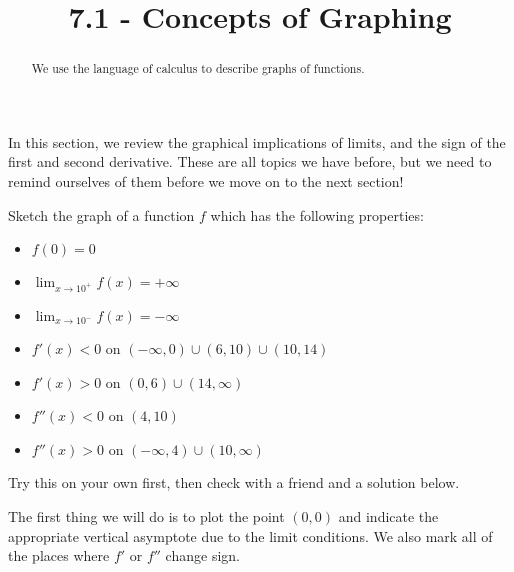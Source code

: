 \documentclass{ximera}
\title{7.1 - Concepts of Graphing}
\begin{document}
\begin{abstract}
  We use the language of calculus to describe graphs of functions.
\end{abstract}
\maketitle

In this section, we review the graphical implications of limits, and
the sign of the first and second derivative.  These are all topics we have before, but we need to remind ourselves of them before we move on to the next section!

\begin{example}
  Sketch the graph of a function $f$ which has the following properties:
  \begin{itemize}
  \item $f(0)=0$
  \item $\lim_{x \to 10^+} f(x) = +\infty$
  \item $\lim_{x \to 10^-} f(x) = -\infty$
  \item $f'(x)<0$ on $(-\infty,0) \cup (6,10) \cup (10,14)$
  \item $f'(x)>0$ on $(0,6) \cup (14,\infty)$
  \item $f''(x)<0$ on $(4,10)$
  \item $f''(x)>0$ on $(-\infty,4) \cup (10,\infty)$
  \end{itemize}
  \begin{explanation}
    Try this on your own first, then check with a friend and a solution below.
    
    \begin{hint}
      The first thing we will do is to plot the point $(0,0)$ and
      indicate the appropriate vertical asymptote due to the limit
      conditions.  We also mark all of the places where $f'$ or $f''$
      change sign.
      

\end{hint}
\end{explanation}
\end{example}
\end{document}
